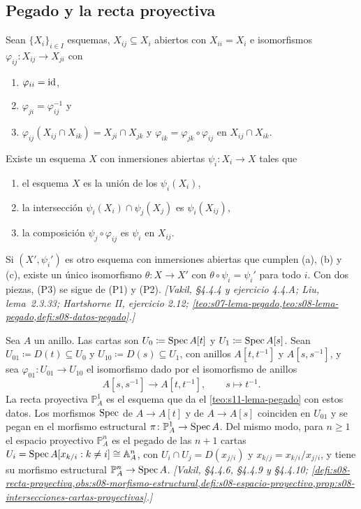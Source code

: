 \subsection{Pegado y la recta proyectiva}

\begin{teo}
\label{teo:s11-lema-pegado}
Sean \(\{X_i\}_{i\in I}\) esquemas, \(X_{ij}\subseteq X_i\) abiertos con \(X_{ii}=X_i\) e isomorfismos \(\varphi_{ij}\colon X_{ij}\to X_{ji}\) con
\begin{enumerate}[label=(P\arabic*), leftmargin=2.1em]
\item \(\varphi_{ii}=\operatorname{id}\),
\item \(\varphi_{ji}=\varphi_{ij}^{-1}\) y
\item \(\varphi_{ij}(X_{ij}\cap X_{ik})=X_{ji}\cap X_{jk}\) y \(\varphi_{ik}=\varphi_{jk}\circ\varphi_{ij}\) en \(X_{ij}\cap X_{ik}\).
\end{enumerate}
Existe un esquema \(X\) con inmersiones abiertas \(\psi_i\colon X_i\to X\) tales que
\begin{enumerate}[label=(\alph*)]
\item el esquema \(X\) es la unión de los \(\psi_i(X_i)\),
\item la intersección \(\psi_i(X_i)\cap\psi_j(X_j)\) es \(\psi_i(X_{ij})\),
\item la composición \(\psi_j\circ\varphi_{ij}\) es \(\psi_i\) en \(X_{ij}\).
\end{enumerate}
Si \((X',\psi_i')\) es otro esquema con inmersiones abiertas que cumplen (a), (b) y (c), existe un único isomorfismo \(\theta\colon X\to X'\) con \(\theta\circ\psi_i=\psi_i'\) para todo \(i\). Con dos piezas, (P3) se sigue de (P1) y (P2). \emph{[Vakil, \S4.4.4 y ejercicio 4.4.A; Liu, lema~2.3.33; Hartshorne II, ejercicio 2.12; \cref{teo:s07-lema-pegado,teo:s08-lema-pegado,defi:s08-datos-pegado}.]}
\end{teo}

\begin{defi}
\label{defi:s11-recta-proyectiva}
Sea \(A\) un anillo. Las cartas son \(U_0\coloneqq\operatorname{Spec} A[t]\) y \(U_1\coloneqq\operatorname{Spec} A[s]\). Sean \(U_{01}\coloneqq D(t)\subseteq U_0\) y \(U_{10}\coloneqq D(s)\subseteq U_1\), con anillos \(A[t,t^{-1}]\) y \(A[s,s^{-1}]\), y sea \(\varphi_{01}\colon U_{01}\to U_{10}\) el isomorfismo dado por el isomorfismo de anillos
\[
 A[s,s^{-1}]\longrightarrow A[t,t^{-1}],\qquad s\longmapsto t^{-1}.
\]
La recta proyectiva \(\mathbb P_A^1\) es el esquema que da el \cref{teo:s11-lema-pegado} con estos datos. Los morfismos \(\operatorname{Spec}\) de \(A\to A[t]\) y de \(A\to A[s]\) coinciden en \(U_{01}\) y se pegan en el morfismo estructural \(\pi\colon\mathbb P_A^1\to\operatorname{Spec} A\). Del mismo modo, para \(n\ge1\) el espacio proyectivo \(\mathbb P_A^n\) es el pegado de las \(n+1\) cartas \(U_i=\operatorname{Spec} A[x_{k/i}:k\ne i]\cong\mathbb A_A^n\), con \(U_i\cap U_j=D(x_{j/i})\) y \(x_{k/j}=x_{k/i}/x_{j/i}\), y tiene su morfismo estructural \(\mathbb P_A^n\to\operatorname{Spec} A\). \emph{[Vakil, \S4.4.6, \S4.4.9 y \S4.4.10; \cref{defi:s08-recta-proyectiva,obs:s08-morfismo-estructural,defi:s08-espacio-proyectivo,prop:s08-intersecciones-cartas-proyectivas}.]}
\end{defi}

